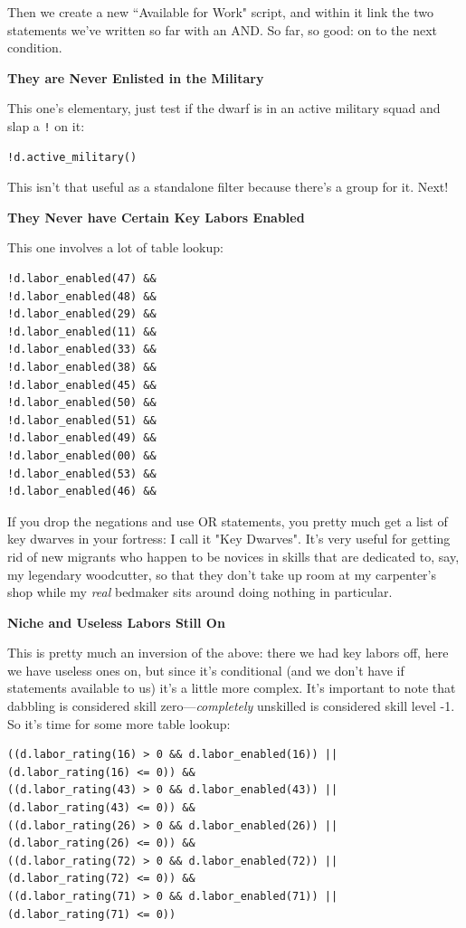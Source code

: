 \documentclass[]{article}
\begin{document}
Then we create a new ``Available for Work" script, and within it link the two statements we've written so
far with an AND. So far, so good: on to the next condition.
\vspace{12pt}

\textbf{They are Never Enlisted in the Military}

This one's elementary, just test if the dwarf is in an active military squad and slap a \texttt{!} on it:
\begin{verbatim}
!d.active_military()
\end{verbatim}

This isn't that useful as a standalone filter because there's a group for it. Next!
\vspace{12pt}

\textbf{They Never have Certain Key Labors Enabled}

This one involves a lot of table lookup:
\begin{multicols}{3}
\begin{verbatim}
!d.labor_enabled(47) &&
!d.labor_enabled(48) &&
!d.labor_enabled(29) &&
!d.labor_enabled(11) &&
!d.labor_enabled(33) &&
!d.labor_enabled(38) &&
!d.labor_enabled(45) &&
!d.labor_enabled(50) &&
!d.labor_enabled(51) &&
!d.labor_enabled(49) &&
!d.labor_enabled(00) &&
!d.labor_enabled(53) &&
!d.labor_enabled(46) &&
\end{verbatim}
\end{multicols}

If you drop the negations and use OR statements, you pretty much get a list of key dwarves in your
fortress: I call it "Key Dwarves". It's very useful for getting rid of new migrants who happen to be
novices in skills that are dedicated to, say, my legendary woodcutter, so that they don't take up room at
my carpenter's shop while my \emph{real} bedmaker sits around doing nothing in particular.
\vspace{12pt}

\textbf{Niche and Useless Labors Still On}

This is pretty much an inversion of the above: there we had key labors off, here we have useless ones on,
but since it's conditional (and we don't have if statements available to us) it's a little more complex.
It's important to note that dabbling is considered skill zero---\emph{completely} unskilled is considered
skill level -1. So it's time for some more table lookup:
\begin{verbatim}
((d.labor_rating(16) > 0 && d.labor_enabled(16)) || (d.labor_rating(16) <= 0)) &&
((d.labor_rating(43) > 0 && d.labor_enabled(43)) || (d.labor_rating(43) <= 0)) &&
((d.labor_rating(26) > 0 && d.labor_enabled(26)) || (d.labor_rating(26) <= 0)) &&
((d.labor_rating(72) > 0 && d.labor_enabled(72)) || (d.labor_rating(72) <= 0)) &&
((d.labor_rating(71) > 0 && d.labor_enabled(71)) || (d.labor_rating(71) <= 0))
\end{verbatim}
\end{document}
